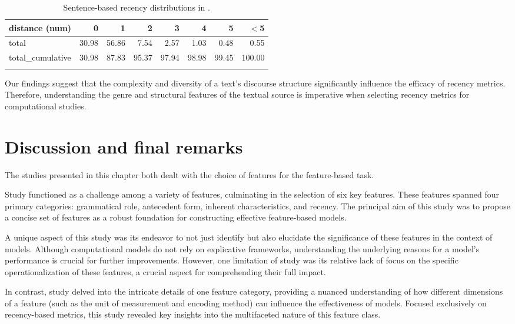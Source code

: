 \begin{table}[b]
\begin{tabularx}{\textwidth}{Xrrrrrrr}
	\lsptoprule
	distance (num) & 0 & 1 & 2 & 3 & 4 & 5 & $<$5 \\ 
	\midrule
	 total & 30.98 & 56.86 & 7.54 & 2.57 & 1.03 & 0.48 & 0.55 \\ 
	total\_cumulative & 30.98 & 87.83 & 95.37 & 97.94 & 98.98 & 99.45 & 100.00 \\ 
	\lspbottomrule
\end{tabularx}\caption{Sentence-based recency distributions in \msrcor.}\label{tab:msrrecdistrib}
\end{table}

Our findings suggest that the complexity and diversity of a text's discourse structure significantly influence the efficacy of recency metrics. Therefore, understanding the genre and structural features of the textual source is imperative when selecting recency metrics for computational studies.

\section{Discussion and final remarks}
The studies presented in this chapter both dealt with the choice of features for the feature-based \context task.

Study \studB functioned as a  challenge among a variety of features, culminating in the selection of six key features. These features spanned four primary categories: grammatical role, antecedent form, inherent characteristics, and recency. The principal aim of this study was to propose a concise set of features as a robust foundation for constructing effective feature-based \context models.

A unique aspect of this study was its endeavor to not just identify but also elucidate the significance of these features in the context of \context models. Although computational models do not rely on explicative frameworks, understanding the underlying reasons for a model's performance is crucial for further improvements. However, one limitation of study \studB was its relative lack of focus on the specific operationalization of these features, a crucial aspect for comprehending their full impact.

In contrast, study \studC delved into the intricate details of one feature category, providing a nuanced understanding of how different dimensions of a feature (such as the unit of measurement and encoding method) can influence the effectiveness of \context models. Focused exclusively on recency-based metrics, this study revealed key insights into the multifaceted nature of this feature class.

